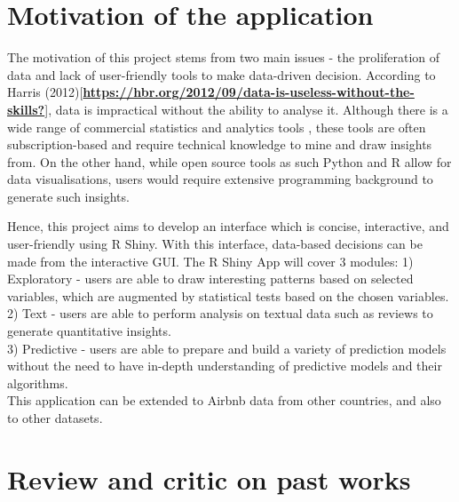 \documentclass{acm_proc_article-sp}
\begin{document}
\hypertarget{motivation-of-the-application}{%
\section{Motivation of the
application}\label{motivation-of-the-application}}

The motivation of this project stems from two main issues - the
proliferation of data and lack of user-friendly tools to make
data-driven decision. According to Harris
(2012){[}\protect\hyperlink{ref-https:ux2fux2fhbr.orgux2f2012ux2f09ux2fdata-is-useless-without-the-skills}{\textbf{https://hbr.org/2012/09/data-is-useless-without-the-skills?}}{]},
data is impractical without the ability to analyse it. Although there is
a wide range of commercial statistics and analytics tools , these tools
are often subscription-based and require technical knowledge to mine and
draw insights from. On the other hand, while open source tools as such
Python and R allow for data visualisations, users would require
extensive programming background to generate such insights.

Hence, this project aims to develop an interface which is concise,
interactive, and user-friendly using R Shiny. With this interface,
data-based decisions can be made from the interactive GUI. The R Shiny
App will cover 3 modules: 1) Exploratory - users are able to draw
interesting patterns based on selected variables, which are augmented by
statistical tests based on the chosen variables. 2) Text - users are
able to perform analysis on textual data such as reviews to generate
quantitative insights.\\
3) Predictive - users are able to prepare and build a variety of
prediction models without the need to have in-depth understanding of
predictive models and their algorithms.\\
This application can be extended to Airbnb data from other countries,
and also to other datasets.

\hypertarget{review-and-critic-on-past-works}{%
\section{Review and critic on past
works}\label{review-and-critic-on-past-works}}
\end{document}
